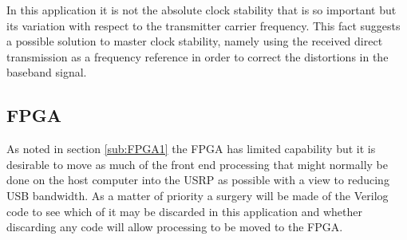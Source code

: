 \documentclass[a4paper]{report}
\numberwithin{equation}{chapter}
\begin{document}
\bigskip

In this application it is not the absolute clock stability that is so important but its variation with respect to the transmitter carrier frequency. This fact suggests a possible solution to master clock stability, namely using the received direct transmission as a frequency reference in order to correct the distortions in the baseband signal.

\subsection{FPGA}

As noted in section \ref{sub:FPGA1} the FPGA has limited capability but it is desirable to move as much of the front end processing that might normally be done on the host computer into the USRP as possible with a view to reducing USB bandwidth. As a matter of priority a surgery will be made of the Verilog code to see which of it may be discarded in this application and whether discarding any code will allow processing to be moved to the FPGA.
\end{document}
